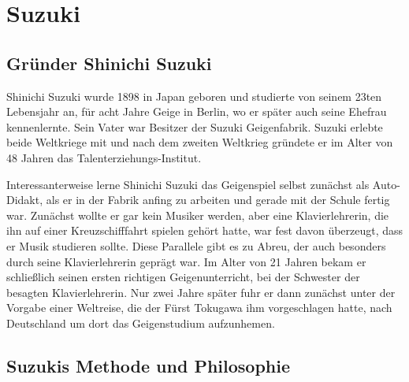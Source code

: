 \section{Suzuki}

\subsection{Gründer Shinichi Suzuki} %
Shinichi Suzuki wurde 1898 in Japan geboren und studierte von seinem 23ten
Lebensjahr an, für acht Jahre Geige in Berlin, wo er später auch seine Ehefrau
kennenlernte. Sein Vater war Besitzer der Suzuki Geigenfabrik. Suzuki erlebte
beide Weltkriege mit und nach dem zweiten Weltkrieg gründete er im Alter
von 48 Jahren das Talenterziehungs-Institut. 

Interessanterweise lerne Shinichi Suzuki das Geigenspiel selbst zunächst als Auto-Didakt, als er
in der Fabrik anfing zu arbeiten und gerade mit der Schule fertig war. Zunächst
wollte er gar kein Musiker werden, aber eine Klavierlehrerin, die ihn auf einer
Kreuzschifffahrt spielen gehört hatte, war fest davon überzeugt, dass er Musik
studieren sollte. \autocite[89]{suzuki:erziehung_ist_liebe} Diese Parallele gibt
es zu Abreu, der auch besonders durch seine Klavierlehrerin geprägt war. Im Alter von 21
Jahren bekam er schließlich seinen ersten richtigen Geigenunterricht, bei der
Schwester der besagten Klavierlehrerin. Nur zwei Jahre später fuhr er dann
zunächst unter der Vorgabe einer Weltreise, die der Fürst Tokugawa ihm
vorgeschlagen hatte, nach Deutschland um dort das Geigenstudium aufzunhemen.
\autocite[90ff]{suzuki:erziehung_ist_liebe}

\subsection{Suzukis Methode und Philosophie}

